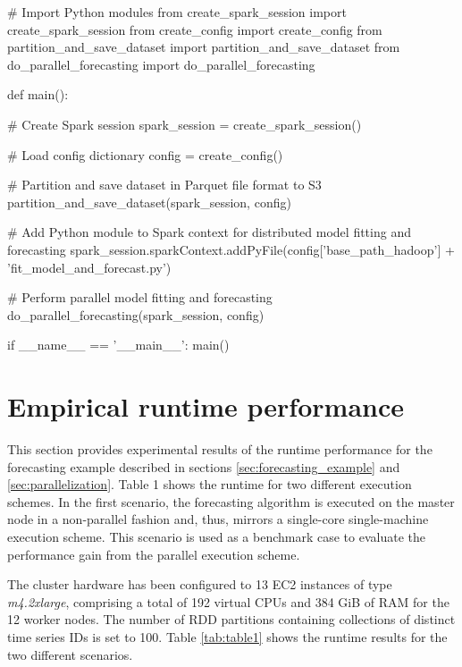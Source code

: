 \documentclass[11pt]{article}
\begin{document}
\begin{python}[caption={\emph{main.py}}]
# Import Python modules
from create_spark_session import create_spark_session
from create_config import create_config
from partition_and_save_dataset import partition_and_save_dataset
from do_parallel_forecasting import do_parallel_forecasting


def main():

    # Create Spark session
    spark_session = create_spark_session()

    # Load config dictionary
    config = create_config()

    # Partition and save dataset in Parquet file format to S3
    partition_and_save_dataset(spark_session, config)

    # Add Python module to Spark context for distributed model fitting and forecasting
    spark_session.sparkContext.addPyFile(config['base_path_hadoop'] + 
                                         'fit_model_and_forecast.py')

    # Perform parallel model fitting and forecasting
    do_parallel_forecasting(spark_session, config)

if __name__ == '__main__':
    main()
\end{python} 

\section{Empirical runtime performance}
\label{sec:empirical_results}

This section provides experimental results of the runtime performance for the forecasting example described in sections \ref{sec:forecasting_example} and \ref{sec:parallelization}. Table 1 shows the runtime for two different execution schemes. In the first scenario, the forecasting algorithm is executed on the master node in a non-parallel fashion and, thus, mirrors a single-core single-machine execution scheme. This scenario is used as a benchmark case to evaluate the performance gain from the parallel execution scheme. 

The cluster hardware has been configured to 13 EC2 instances of type \emph{m4.2xlarge}, comprising a total of 192 virtual CPUs and 384 GiB of RAM for the 12 worker nodes. The number of RDD partitions containing collections of distinct time series IDs is set to 100. Table \ref{tab:table1} shows the runtime results for the two different scenarios.  
\end{document}
